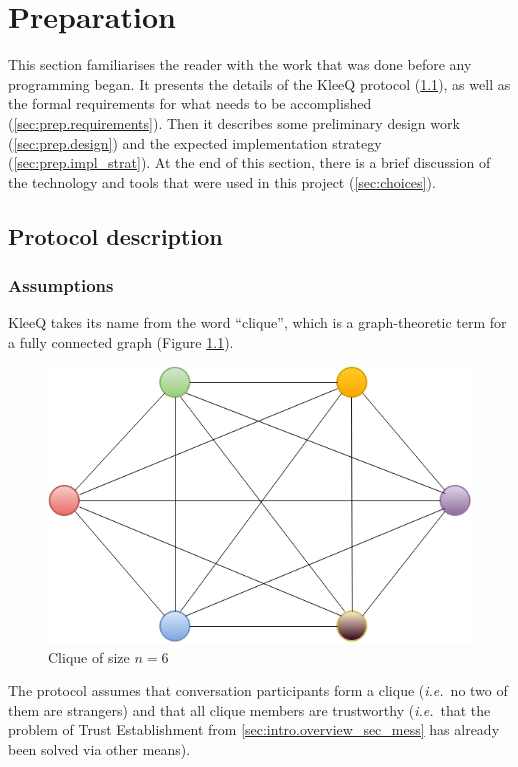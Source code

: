 \documentclass[a4paper, twoside, 12pt]{report}
\newcommand{\skippage}{\cleardoublepage}
\begin{document}
\skippage

\chapter{Preparation}
\label{ch:prep}
This section familiarises the reader with the work that was done before any programming began. It presents the details of the KleeQ protocol (\cref{sec:prep.proto}), as well as the formal requirements for what needs to be accomplished (\cref{sec:prep.requirements}). Then it describes some preliminary design work (\cref{sec:prep.design}) and the expected implementation strategy (\cref{sec:prep.impl_strat}). At the end of this section, there is a brief discussion of the technology and tools that were used in this project (\cref{sec:choices}).

\section{Protocol description}
\label{sec:prep.proto}

\subsection{Assumptions}
KleeQ takes its name from the word ``clique'', which is a graph-theoretic term for a fully connected graph (Figure \ref{fig:clique}).
\begin{figure}[h]
    \centering
    \includegraphics[scale = 0.5]{pics/clique.png}
    \caption{Clique of size $n = 6$ \label{fig:clique}}
\end{figure}
The protocol assumes that conversation participants form a clique (\textit{i.e.}~no two of them are strangers) and that all clique members are trustworthy (\textit{i.e.}~that the problem of Trust Establishment from \cref{sec:intro.overview_sec_mess} has already been solved via other means). 
\end{document}
